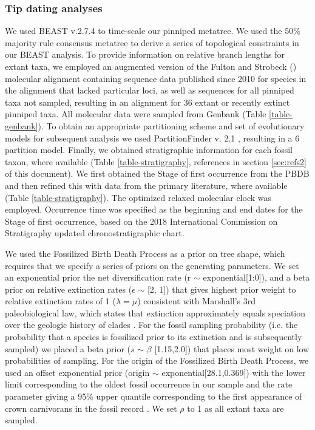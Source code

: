 \documentclass[a4paper, 12pt]{article}
\begin{document}
\subsubsection{Tip dating analyses} 

We used BEAST v.2.7.4 \citep{bouckaert2014beast} to time-scale our pinniped metatree. We used the 50\% majority rule consensus metatree to derive a series of topological constraints in our BEAST analysis. To provide information on relative branch lengths for extant taxa, we employed an augmented version of the Fulton and Strobeck (\citeyear{fulton2010multiple}) molecular alignment containing  sequence data published since 2010 for species in the alignment that lacked particular loci, as well as sequences for all pinniped taxa not sampled, resulting in an alignment for 36 extant or recently extinct pinniped taxa. All molecular data were sampled from Genbank (Table \ref{table-genbank}). To obtain an appropriate partitioning scheme and set of evolutionary models for subsequent analysis we used PartitionFinder v. 2.1 \citep{lanfear2017partitionfinder}, resulting in a 6 partition model. Finally, we obtained stratigraphic information for each fossil taxon, where available (Table \ref{table-stratigraphy}, references in section \ref{sec:refs2} of this document). We first obtained the Stage of first occurrence from the PBDB and then refined this with data from the primary literature, where available (Table \ref{table-stratigraphy}). The optimized relaxed molecular clock was employed. Occurrence time was specified as the beginning and end dates for the Stage of first occurrence, based on the 2018 International Commission on Stratigraphy updated chronostratigraphic chart. 
 
\noindent We used the Fossilized Birth Death Process \citep{heath2014fossilized,gavryushkina2017bayesian} as a prior on tree shape, which requires that we specify a series of priors on the generating parameters. We set an exponential prior the net diversification rate (r $\sim$ exponential[1:0]), and a beta prior on relative extinction rates ($\epsilon$ $\sim$ [2, 1]) that gives highest prior weight to relative extinction rates of 1 ($\lambda = \mu$) consistent with Marshall's 3rd paleobiological law, which states that extinction approximately equals speciation over the geologic history of clades \citep{marshall2017five}. For the fossil sampling probability (i.e. the probability that a species is fossilized prior to its extinction and is subsequently sampled) we placed a beta prior ($s$ $\sim$ $\beta$ [1.15,2.0]) that places most weight on low probabilities of sampling. For the origin of the Fossilized Birth Death Process, we used an offset exponential prior (origin $\sim$ exponential[28.1,0.369]) with the lower limit corresponding to the oldest fossil occurrence in our sample and the rate parameter giving a 95\% upper quantile corresponding to the first appearance of crown carnivorans in the fossil record \citep{tomiya2021carnivorous}. We set $\rho$ to 1 as all extant taxa are sampled.
\end{document}

